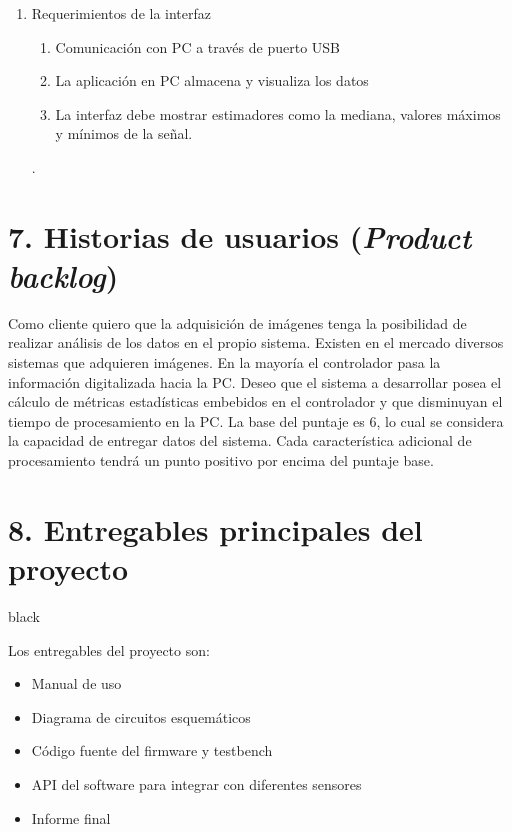 \documentclass[
11pt, %
codirector, %
]{charter}
\begin{document}
\begin{enumerate}
	\item Requerimientos de la interfaz
	\begin{enumerate}
			\item Comunicación con PC a través de puerto USB
			\item La aplicación en PC almacena y visualiza los datos
			\item La interfaz debe mostrar estimadores como la mediana, valores máximos y mínimos de la señal.
		\end{enumerate}.
\end{enumerate}


\section{7. Historias de usuarios (\textit{Product backlog})}
\label{sec:backlog}


Como cliente quiero que la adquisición de imágenes tenga la posibilidad de realizar análisis de los datos en el propio sistema. Existen en el mercado diversos sistemas que adquieren imágenes. En la mayoría el controlador pasa la información digitalizada hacia la PC. Deseo que el sistema a desarrollar posea el cálculo de métricas estadísticas embebidos en el controlador y que disminuyan el tiempo de procesamiento en la PC. La base del puntaje es 6, lo cual se considera la capacidad de entregar datos del sistema. Cada característica adicional de procesamiento tendrá un punto positivo por encima del puntaje base.


\section{8. Entregables principales del proyecto}
\label{sec:entregables}

\begin{consigna}{black}

Los entregables del proyecto son:

\begin{itemize}
	\item Manual de uso
	\item Diagrama de circuitos esquemáticos
	\item Código fuente del firmware y testbench
	\item API del software para integrar con diferentes sensores
	\item Informe final
\end{itemize}

\end{consigna}
\end{document}
